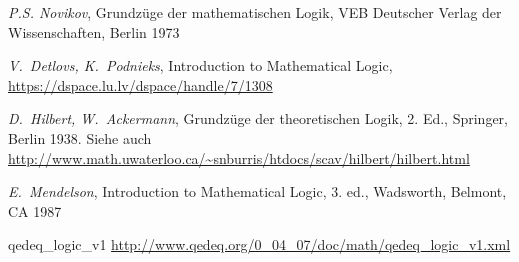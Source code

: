 \documentclass[a4paper,german,10pt,twoside]{book}
\theoremstyle{definition}
\theoremstyle{remark}
\begin{document}
\begin{thebibliography}{99}
 \emph{P.S. Novikov}, Grundz{\"u}ge der mathematischen Logik, VEB Deutscher Verlag der Wissenschaften, Berlin 1973

 \emph{V.~Detlovs, K.~Podnieks}, Introduction to Mathematical Logic, \url{ https://dspace.lu.lv/dspace/handle/7/1308}

 \emph{D.~Hilbert, W.~Ackermann}, Grundz{\"u}ge der theoretischen Logik, 2. Ed., Springer, Berlin 1938. Siehe auch \url{http://www.math.uwaterloo.ca/~snburris/htdocs/scav/hilbert/hilbert.html}

 \emph{E.~Mendelson}, Introduction to Mathematical Logic, 3. ed., Wadsworth, Belmont, CA 1987



 qedeq\_logic\_v1 \url{http://www.qedeq.org/0_04_07/doc/math/qedeq_logic_v1.xml}


\end{thebibliography}
 \printindex
\end{document}
